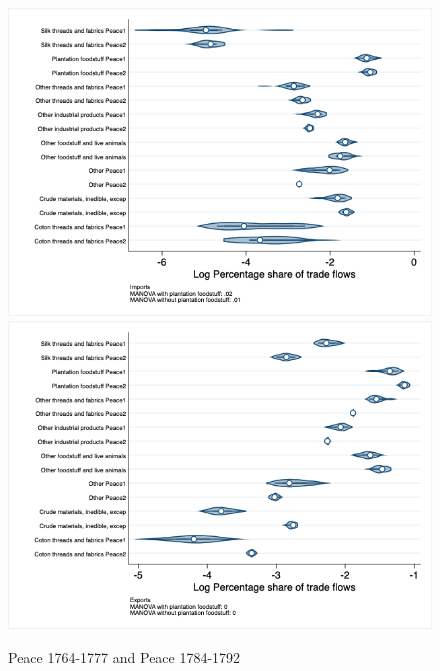 \documentclass[12pt,a4paper,notitlepage,english]{article}
\begin{document}
\begin{appendix}
\begin{figure}[h!]
\centering
\caption{Peace 1764-1777 and Peace 1784-1792}
\label{seven_peace1764_1777_nat_distr_aggr}
\includegraphics[scale=.4]{peace1764_1777_peace1784_1792_nat_distr_Iaggr}
\includegraphics[scale=.4]{peace1764_1777_peace1784_1792_nat_distr_Xaggr}
\end{figure}


\end{appendix}
\end{document}
